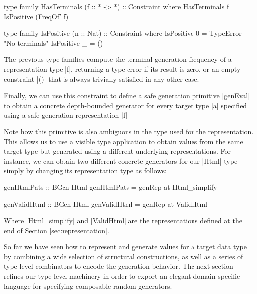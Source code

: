 \begin{code}
type family HasTerminals (f :: * -> *) :: Constraint where
  HasTerminals f = IsPositive (FreqOf' f)

type family IsPositive (n :: Nat) :: Constraint where
  IsPositive 0 = TypeError "No terminals"
  IsPositive _ = ()
\end{code}

The previous type families compute the terminal generation frequency of a
representation type |f|, returning a type error if its result is zero, or an
empty constraint |()| that is always trivially satisfied in any other case.

%
Finally, we can use this constraint to define a safe generation primitive
|genEval| to obtain a concrete depth-bounded generator for every target type |a|
specified using a safe generation representation |f|:


Note how this primitive is also ambiguous in the type used for the
representation.
%
This allows us to use a visible type application to obtain values from the same
target type but generated using a different underlying representations.
%
For instance, we can obtain two different concrete generators for our |Html|
type simply by changing its representation type as follows:

\begin{code}
genHtmlPats :: BGen Html
genHtmlPats = genRep at Html_simplify

genValidHtml :: BGen Html
genValidHtml = genRep  at ValidHtml
\end{code}

Where |Html_simplify| and |ValidHtml| are the representations defined at the end
of Section \ref{sec:representation}.


%
So far we have seen how to represent and generate values for a target data type
by combining a wide selection of structural constructions, as well as a series
of type-level combinators to encode the generation behavior.
%
The next section refines our type-level machinery in order to export an elegant
domain specific language for specifying composable random generators.
